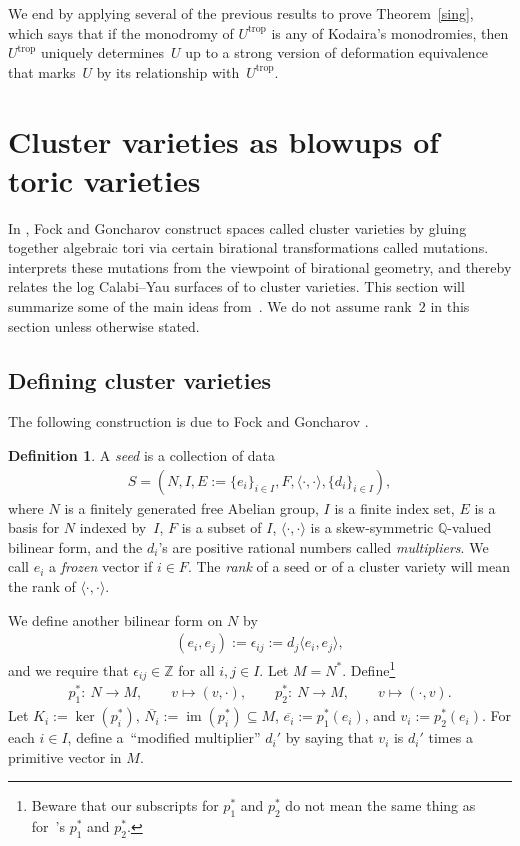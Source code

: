 \documentclass[pdftex]{sigma}
\numberwithin{equation}{section}
\numberwithin{figure}{section}
\numberwithin{table}{section}
\DeclareMathOperator{\im}{im}
\DeclareMathOperator{\trop}{trop}
\let\?=\overline
\let\bb=\mathbb
\let\rar=\rightarrow
\theoremstyle{definition}
\newtheorem{dfn}[thm]{Definition}
\begin{document}
We end by applying several of the previous results to prove Theorem~\ref{sing}, which says that if the monodromy of $U^{\trop}$ is any of Kodaira's monodromies, then $U^{\trop}$ uniquely determines~$U$ up to a strong version of deformation equivalence that marks~$U$ by its relationship with~$U^{\trop}$.

\section{Cluster varieties as blowups of toric varieties} \label{cluster}

In \cite{FG1}, Fock and Goncharov construct spaces called cluster varieties by gluing together algebraic tori via certain birational transformations called mutations. \cite{GHK3} interprets these mutations from the viewpoint of birational geometry, and thereby relates the log Calabi--Yau surfaces of \cite{GHK1} to cluster varieties. This section will summarize some of the main ideas from~\cite{GHK3}. We do not assume rank~$2$ in this section unless otherwise stated.

\subsection{Defining cluster varieties}\label{ClusterDefs}
The following construction is due to Fock and Goncharov \cite{FG1}.

\begin{dfn}A {\it seed} is a collection of data
\begin{gather*} S=(N,I,E:=\{e_i\}_{i\in I},F,\langle\cdot,\cdot\rangle,\{d_i\}_{i\in I}),\end{gather*}
where $N$ is a finitely generated free Abelian group, $I$ is a finite index set, $E$ is a basis for $N$ indexed by~$I$, $F$ is a subset of $I$, $\langle \cdot,\cdot\rangle$ is a skew-symmetric $\bb{Q}$-valued bilinear form, and the $d_i$'s are positive rational numbers called {\it multipliers}. We call $e_i$ a {\it frozen} vector if $i \in F$. The {\it rank} of a seed or of a cluster variety will mean the rank of $\langle \cdot, \cdot \rangle$.

We define another bilinear form on $N$ by
\begin{gather*} (e_i,e_j):=\epsilon_{ij}:=d_j\langle e_i,e_j \rangle,\end{gather*} and we require that $\epsilon_{ij}\in \bb{Z}$ for all $i,j\in I$.
 Let $M=N^*$. Define\footnote{Beware that our subscripts for $p_1^*$ and $p_2^*$ do not mean the same thing as for~\cite{GHK3}'s $p_1^*$ and $p_2^*$.}
 \begin{gather*} p_1^*\colon \ N\rar M,\qquad v\mapsto (v,\cdot), \qquad p_2^*\colon \ N\rar M,\qquad v\mapsto (\cdot,v).
 \end{gather*} Let $K_i:= \ker (p_i^*)$, $\?{N_i} := \im(p_i^*)\subseteq M$, $\?{e_i}:=p_1^*(e_i)$, and $v_i:=p_2^*(e_i)$. For each $i\in I$, define a~``modified multiplier'' $d_i'$ by saying that $v_i$ is $d_i'$ times a primitive vector in $M$.
\end{dfn}
\end{document}
